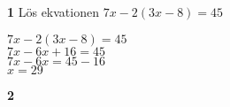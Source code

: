 \documentclass{article}
\begin{document}
\textbf{1} Lös ekvationen $7x-2(3x-8)=45$

$7x-2(3x-8)=45$\\
$7x-6x+16=45$\\
$7x-6x=45-16$\\
$x=29$

\textbf{2}
\end{document}
